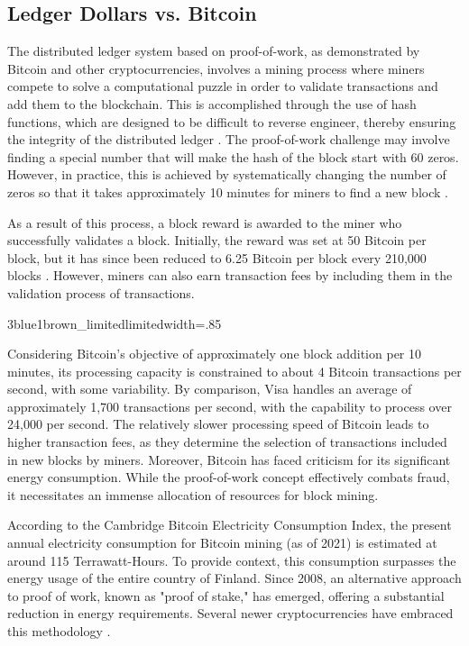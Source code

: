 \subsection{Ledger Dollars vs. Bitcoin}
The distributed ledger system based on proof-of-work, as demonstrated by Bitcoin and other cryptocurrencies, involves a mining process where
miners compete to solve a computational puzzle in order to validate transactions and add them to the blockchain. This is accomplished through
the use of hash functions, which are designed to be difficult to reverse engineer, thereby ensuring the integrity of the distributed ledger
\cite{bashir2017mastering}. The proof-of-work challenge may involve finding a special number that will make the hash of the block start with
60 zeros. However, in practice, this is achieved by systematically changing the number of zeros so that it takes approximately 10 minutes
for miners to find a new block \cite{nakamoto2008bitcoin}.

As a result of this process, a block reward is awarded to the miner who successfully validates a block. Initially, the reward was set at
50 Bitcoin per block, but it has since been reduced to 6.25 Bitcoin per block every 210,000 blocks \cite{nakamoto2008bitcoin}. However,
miners can also earn transaction fees by including them in the validation process of transactions.

{3blue1brown_limited}{limited}{width=.85\textwidth}%

Considering Bitcoin's objective of approximately one block addition per 10 minutes, its processing capacity is constrained to about 4 Bitcoin
transactions per second, with some variability. By comparison, Visa handles an average of approximately 1,700 transactions per second, with
the capability to process over 24,000 per second. The relatively slower processing speed of Bitcoin leads to higher transaction fees, as
they determine the selection of transactions included in new blocks by miners. Moreover, Bitcoin has faced criticism for its significant
energy consumption. While the proof-of-work concept effectively combats fraud, it necessitates an immense allocation of resources for block
mining.

According to the Cambridge Bitcoin Electricity Consumption Index, the present annual electricity consumption for Bitcoin mining (as of 2021)
is estimated at around 115 Terrawatt-Hours. To provide context, this consumption surpasses the energy usage of the entire country of Finland.
Since 2008, an alternative approach to proof of work, known as "proof of stake," has emerged, offering a substantial reduction in energy
requirements. Several newer cryptocurrencies have embraced this methodology \cite{CBECS2021}.
